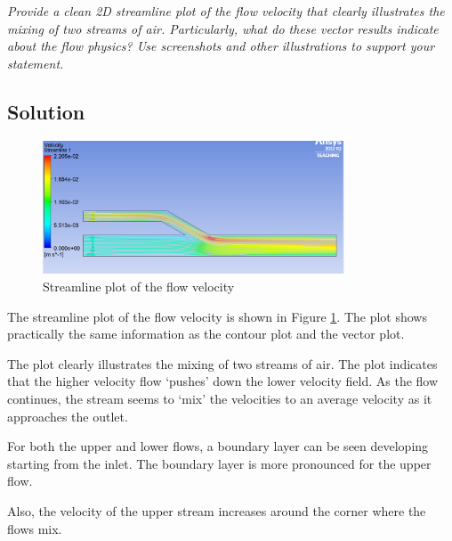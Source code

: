 
\section{}
\textit{Provide a clean 2D streamline plot of the flow velocity that clearly illustrates the mixing of two
streams of air. Particularly, what do these vector results indicate about the flow physics?
Use screenshots and other illustrations to support your statement.}

\subsection*{Solution}
\begin{figure}[h]
    \centering
    \includegraphics[width=0.8\textwidth]{Questions/Figures/velocity streamline.png}
    \caption{Streamline plot of the flow velocity}
    \label{fig:contour}
\end{figure}

The streamline plot of the flow velocity is shown in Figure \ref{fig:contour}. The plot shows practically the same information as the contour plot and the vector plot.

The plot clearly illustrates the mixing of two streams of air. The plot indicates that the higher velocity flow `pushes' down the lower velocity field. As the flow continues, the stream seems to `mix' the velocities to an average velocity as it approaches the outlet.

For both the upper and lower flows, a boundary layer can be seen developing starting from the inlet. The boundary layer is more pronounced for the upper flow.

Also, the velocity of the upper stream increases around the corner where the flows mix.